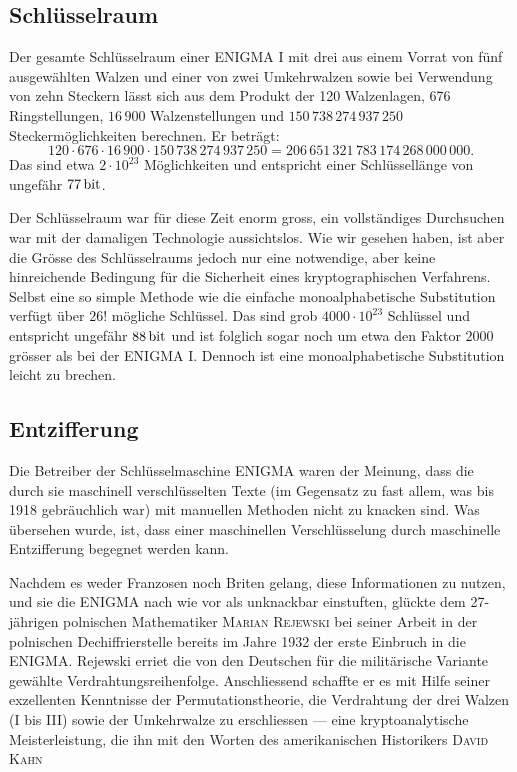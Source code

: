 \documentclass[%
11pt,%
twoside,%
titlepage,%
german,%
headsepline%
]{scrartcl}
\newcounter{theo}[section]\setcounter{theo}{0}
\begin{document}
\subsection{Schlüsselraum}

Der gesamte Schlüsselraum einer ENIGMA I mit drei aus einem Vorrat von fünf ausgewählten Walzen und einer von zwei Umkehrwalzen sowie bei Verwendung von zehn Steckern lässt sich aus dem Produkt der 120 Walzenlagen, 676 Ringstellungen, $16\,900$ Walzenstellungen und $150\,738\,274\,937\,250$ Steckermöglichkeiten berechnen. Er beträgt:
$$120\cdot676\cdot16\,900\cdot150\,738\,274\,937\,250=206\,651\,321\,783\,174\,268\,000\,000.$$
Das sind etwa $2\cdot10^{23}$ Möglichkeiten und entspricht einer Schlüssellänge von ungefähr $\unit[77]{bit}$.

Der Schlüsselraum war für diese Zeit enorm gross, ein vollständiges Durchsuchen war mit der damaligen Technologie aussichtslos. Wie wir gesehen haben, ist aber die Gr\"osse des Schlüs\-sel\-raums jedoch nur eine notwendige, aber keine hinreichende Bedingung für die Sicherheit eines kryptographischen Verfahrens. Selbst eine so simple Methode wie die einfache monoalphabetische Substitution verfügt über $26!$ mögliche Schlüssel. Das sind grob $4000\cdot10^{23}$ Schlüssel und entspricht ungefähr $\unit[88]{bit}$ und ist folglich sogar noch um etwa den Faktor $2000$ grösser als bei der ENIGMA I. Dennoch ist eine monoalphabetische Substitution leicht zu brechen.

\subsection{Entzifferung}

Die Betreiber der Schlüsselmaschine ENIGMA waren der Meinung, dass die durch sie maschinell verschlüsselten Texte (im Gegensatz zu fast allem, was bis 1918 gebräuchlich war) mit manuellen Methoden nicht zu knacken sind. Was übersehen wurde, ist, dass einer maschinellen Verschlüsselung durch maschinelle Entzifferung begegnet werden kann.

Nachdem es weder Franzosen noch Briten gelang, diese Informationen zu nutzen, und sie die ENIGMA nach wie vor als unknackbar einstuften, glückte dem 27-jährigen polnischen Mathematiker \textsc{Marian Rejewski} bei seiner Arbeit in der polnischen Dechiffrierstelle bereits im Jahre 1932 der erste Einbruch in die ENIGMA. Rejewski erriet die von den Deutschen für die militärische Variante gewählte Verdrahtungsreihenfolge. Anschliessend schaffte er es mit Hilfe seiner exzellenten Kenntnisse der Permutationstheorie, die Verdrahtung der drei Walzen (I bis III) sowie der Umkehrwalze zu erschliessen --- eine kryptoanalytische Meisterleistung, die ihn mit den Worten des amerikanischen Historikers \textsc{David Kahn}
\end{document}
